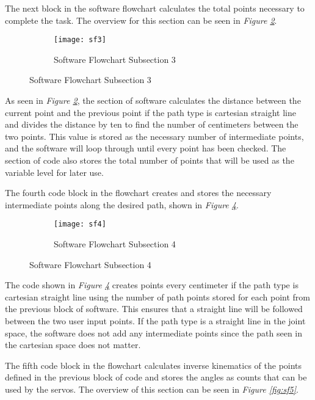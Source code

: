 The next block in the software flowchart calculates the total points necessary to complete the task. The overview for this section can be seen in \emph{Figure \ref{fig:sf3}}.

\begin{figure}[htp]\ContinuedFloat
  \begin{subfigure}[c]{\textwidth}
  \center
  \texttt{[image: sf3]}
  \caption{Software Flowchart Subsection 3}
  \label{fig:sf3}
  \end{subfigure}
\end{figure}

As seen in \emph{Figure \ref{fig:sf3}}, the section of software calculates the distance between the current point and the previous point if the path type is cartesian straight line and divides the distance by ten to find the number of centimeters between the two points. This value is stored as the necessary number of intermediate points, and the software will loop through until every point has been checked. The section of code also stores the total number of points that will be used as the variable level for later use.

The fourth code block in the flowchart creates and stores the necessary intermediate points along the desired path, shown in \emph{Figure \ref{fig:sf4}}.

\begin{figure}[htp] \ContinuedFloat
  \begin{subfigure}[c]{\textwidth}
  \center
  \texttt{[image: sf4]}
  \caption{Software Flowchart Subsection 4}
  \label{fig:sf4}
  \end{subfigure}
\end{figure}

The code shown in \emph{Figure \ref{fig:sf4}} creates points every centimeter if the path type is cartesian straight line using the number of path points stored for each point from the previous block of software. This ensures that a straight line will be followed between the two user input points. If the path type is a straight line in the joint space, the software does not add any intermediate points since the path seen in the cartesian space does not matter.

The fifth code block in the flowchart calculates inverse kinematics of the points defined in the previous block of code and stores the angles as counts that can be used by the servos. The overview of this section can be seen in \emph{Figure \ref{fig:sf5}}.

